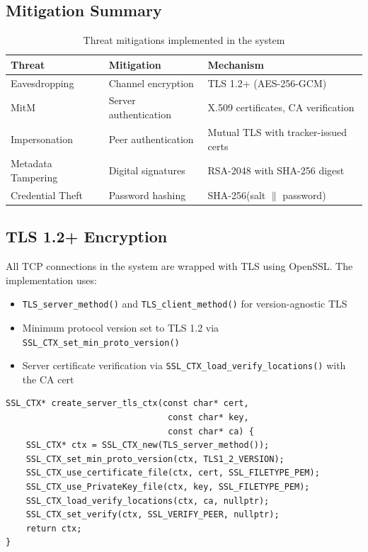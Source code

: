 \documentclass[12pt,a4paper]{article}
\begin{document}
\subsection{Mitigation Summary}

\begin{table}[h]
\centering
\begin{tabular}{@{}lll@{}}
\toprule
\textbf{Threat} & \textbf{Mitigation} & \textbf{Mechanism} \\
\midrule
Eavesdropping & Channel encryption & TLS 1.2+ (AES-256-GCM) \\
MitM & Server authentication & X.509 certificates, CA verification \\
Impersonation & Peer authentication & Mutual TLS with tracker-issued certs \\
Metadata Tampering & Digital signatures & RSA-2048 with SHA-256 digest \\
Credential Theft & Password hashing & SHA-256(salt $\|$ password) \\
\bottomrule
\end{tabular}
\caption{Threat mitigations implemented in the system}
\end{table}

\subsection{TLS 1.2+ Encryption}

All TCP connections in the system are wrapped with TLS using OpenSSL. The implementation uses:

\begin{itemize}
    \item \texttt{TLS\_server\_method()} and \texttt{TLS\_client\_method()} for version-agnostic TLS
    \item Minimum protocol version set to TLS 1.2 via \texttt{SSL\_CTX\_set\_min\_proto\_version()}
    \item Server certificate verification via \texttt{SSL\_CTX\_load\_verify\_locations()} with the CA cert
\end{itemize}

\begin{lstlisting}[caption={TLS Context Creation (Server Side)},label=lst:tls-server]
SSL_CTX* create_server_tls_ctx(const char* cert, 
                                const char* key, 
                                const char* ca) {
    SSL_CTX* ctx = SSL_CTX_new(TLS_server_method());
    SSL_CTX_set_min_proto_version(ctx, TLS1_2_VERSION);
    SSL_CTX_use_certificate_file(ctx, cert, SSL_FILETYPE_PEM);
    SSL_CTX_use_PrivateKey_file(ctx, key, SSL_FILETYPE_PEM);
    SSL_CTX_load_verify_locations(ctx, ca, nullptr);
    SSL_CTX_set_verify(ctx, SSL_VERIFY_PEER, nullptr);
    return ctx;
}
\end{lstlisting}
\end{document}

